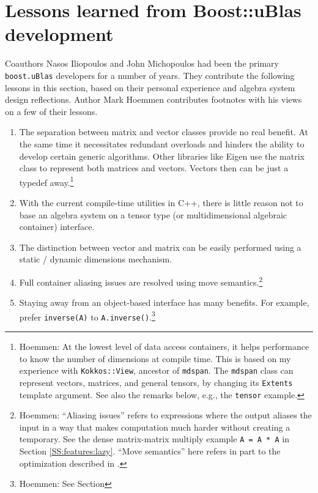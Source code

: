 \section{Lessons learned from Boost::uBlas development}
\label{S:uBlas}

Coauthors Nasos Iliopoulos and John Michopoulos had been the primary
\texttt{boost.uBlas} developers for a number of years. They contribute
the following lessons in this section, based on their personal
experience and algebra system design reflections.  Author Mark Hoemmen
contributes footnotes with his views on a few of their lessons.
 
\begin{enumerate}
\item The separation between matrix and vector classes provide no real
  benefit. At the same time it necessitates redundant overloads and
  hinders the ability to develop certain generic algorithms. Other
  libraries like Eigen use the matrix class to represent both matrices
  and vectors. Vectors then can be just a typedef
  away.\footnote{Hoemmen: At the lowest level of data access
    containers, it helps performance to know the number of dimensions
    at compile time.  This is based on my experience with
    \texttt{Kokkos::View}, ancestor of \texttt{mdspan}.  The
    \texttt{mdspan} class can represent vectors, matrices, and general
    tensors, by changing its \texttt{Extents} template argument.  See
    also the remarks below, e.g., the \texttt{tensor} example.}
\item With the current compile-time utilities in C++, there is little
  reason not to base an algebra system on a tensor type (or
  multidimensional algebraic container) interface.
\item The distinction between vector and matrix can be easily
  performed using a static / dynamic dimensions mechanism.
\item Full container aliasing issues are resolved using move
  semantics.\footnote{Hoemmen: ``Aliasing issues'' refers to
    expressions where the output aliases the input in a way that makes
    computation much harder without creating a temporary.  See the
    dense matrix-matrix multiply example \texttt{A = A * A} in Section
    \ref{SS:features:lazy}.  ``Move semantics'' here refers in part to
    the optimization described in \cite{ropert2019copy}.}
\item Staying away from an object-based interface has many benefits.
  For example, prefer \texttt{inverse(A)} to
  \texttt{A.inverse()}.\footnote{Hoemmen: See Section
}
\end{enumerate}
